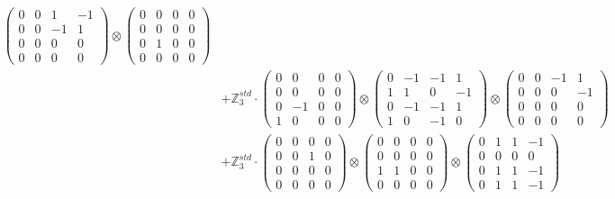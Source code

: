 \documentclass{article}
\begin{document}
{\begin{align}
            \begin{pmatrix} 0 & 0 & 1 & -1 \\ 0 & 0 & -1 & 1 \\ 0 & 0 & 0 & 0 \\ 0 & 0 & 0 & 0 \end{pmatrix} \otimes 
            \begin{pmatrix} 0 & 0 & 0 & 0 \\ 0 & 0 & 0 & 0 \\ 0 & 1 & 0 & 0 \\ 0 & 0 & 0 & 0 \end{pmatrix} \\ 
        &+ \label{Rs16-Rc11-Solution-23-c20} \mathbb{Z}_3^{std} \cdot 
            \begin{pmatrix} 0 & 0 & 0 & 0 \\ 0 & 0 & 0 & 0 \\ 0 & -1 & 0 & 0 \\ 1 & 0 & 0 & 0 \end{pmatrix} \otimes 
            \begin{pmatrix} 0 & -1 & -1 & 1 \\ 1 & 1 & 0 & -1 \\ 0 & -1 & -1 & 1 \\ 1 & 0 & -1 & 0 \end{pmatrix} \otimes 
            \begin{pmatrix} 0 & 0 & -1 & 1 \\ 0 & 0 & 0 & -1 \\ 0 & 0 & 0 & 0 \\ 0 & 0 & 0 & 0 \end{pmatrix} \\ 
        &+ \label{Rs16-Rc11-Solution-23-c21} \mathbb{Z}_3^{std} \cdot 
            \begin{pmatrix} 0 & 0 & 0 & 0 \\ 0 & 0 & 1 & 0 \\ 0 & 0 & 0 & 0 \\ 0 & 0 & 0 & 0 \end{pmatrix} \otimes 
            \begin{pmatrix} 0 & 0 & 0 & 0 \\ 0 & 0 & 0 & 0 \\ 1 & 1 & 0 & 0 \\ 0 & 0 & 0 & 0 \end{pmatrix} \otimes 
            \begin{pmatrix} 0 & 1 & 1 & -1 \\ 0 & 0 & 0 & 0 \\ 0 & 1 & 1 & -1 \\ 0 & 1 & 1 & -1 \end{pmatrix} \\ 

\end{align}}
\end{document}
